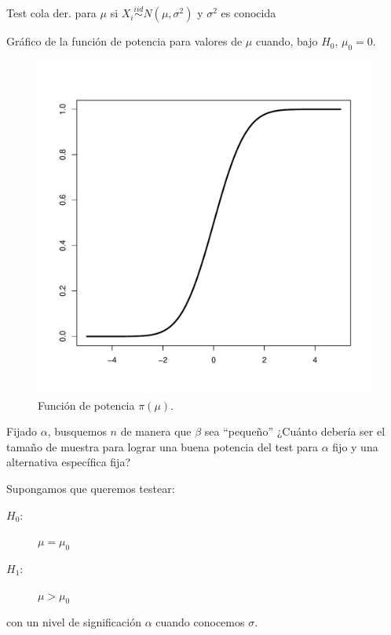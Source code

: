\documentclass{beamer}
\theoremstyle{definition}
\begin{document}
\begin{frame}{\color{rosee}Test cola der. para $\mu$ si $X_i\stackrel{iid}{\sim}N(\mu,\sigma^2)$ y $\sigma^2$ es conocida}\small

Gráfico de la función de potencia para valores de $\mu$ cuando, bajo $H_0$, $\mu_0=0$.
  \begin{figure}
    \centering
    \includegraphics[height=.7\textheight]{img/potencia-1.pdf}
    \caption{Funci\'on de potencia $\pi(\mu)$.}
    \label{fig:potencia-1}
  \end{figure}
\end{frame}



\begin{frame}{\color{rosee}Fijado $\alpha$, busquemos $n$ de manera que $\beta$ sea ``pequeño''}\small
  ¿Cu\'anto deber\'ia ser el tama\~no de muestra para lograr una buena
  potencia del test para $\alpha$ fijo y una alternativa espec\'ifica
  fija?
  
  \bigskip
  Supongamos que queremos testear:
  \begin{description}
  \item[$H_0$:] $\mu = \mu_0$
  \item[$H_1$:] $\mu > \mu_0$
  \end{description}
  con un nivel de significaci\'on $\alpha$ cuando conocemos $\sigma$.
\end{frame}
\end{document}
